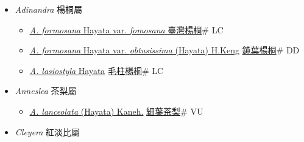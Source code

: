 
  \begin{itemize}
 \item[] \textit{Adinandra} 楊桐屬
                    
  \begin{itemize}
        \item[] \href{http://www.theplantlist.org/tpl1.1/search?q=Adinandra+formosana+var.+fomosana}{\textit{A. formosana} Hayata var. \textit{fomosana} }   \href{\detokenize{http://taibnet.sinica.edu.tw/chi/taibnet_species_list.php?T2=臺灣楊桐&T2_new_value=true&fr=y}}{臺灣楊桐}\# LC
        \item[] \href{http://www.theplantlist.org/tpl1.1/search?q=Adinandra+formosana+var.+obtusissima}{\textit{A. formosana} Hayata var. \textit{obtusissima} (Hayata) H.Keng}   \href{\detokenize{http://taibnet.sinica.edu.tw/chi/taibnet_species_list.php?T2=鈍葉楊桐&T2_new_value=true&fr=y}}{鈍葉楊桐}\# DD
        \item[] \href{http://www.theplantlist.org/tpl1.1/search?q=Adinandra+lasiostyla}{\textit{A. lasiostyla} Hayata}   \href{\detokenize{http://taibnet.sinica.edu.tw/chi/taibnet_species_list.php?T2=毛柱楊桐&T2_new_value=true&fr=y}}{毛柱楊桐}\# LC
  \end{itemize}
 \item[] \textit{Anneslea} 茶梨屬
                    
  \begin{itemize}
        \item[] \href{http://www.theplantlist.org/tpl1.1/search?q=Anneslea+lanceolata}{\textit{A. lanceolata} (Hayata) Kaneh.}   \href{\detokenize{http://taibnet.sinica.edu.tw/chi/taibnet_species_list.php?T2=細葉茶梨&T2_new_value=true&fr=y}}{細葉茶梨}\# VU
  \end{itemize}
 \item[] \textit{Cleyera} 紅淡比屬
                    

\end{itemize}
